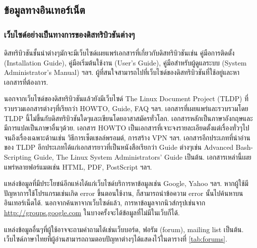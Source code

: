 \begin{thwbr}
\subsection{ข้อมูลทางอินเทอร์เน็ต}
\subsubsection{เว็บไซด์อย่างเป็นทางการของดิสทริบิวชันต่างๆ}
ดิสทริบิวชันชั้นนำต่างๆมักจะมีเว็บไซด์เผยแพร่เอกสารที่เกี่ยวกับดิสทริบิวชันเช่น คู่มือการติดตั้ง (Installation Guide), คู่มือเริ่มต้นใช้งาน (User's Guide), คู่มือสำหรับผู้ดูแลระบบ (System Administrator's Manual) ฯลฯ. ผู้ที่สนใจสามารถไปที่เว็บไซด์ของดิสทริบิวชันที่ใช้อยู่และหาเอกสารที่ต้องการ.

นอกจากเว็บไซด์ของดิสทริบิวชันแล้วยังมีเว็บไซด์ The Linux Document Project (TLDP)\cite{tldp} ที่รวบรวมเอกสารต่างๆที่เรียกว่า HOWTO, Guide, FAQ ฯลฯ. เอกสารที่เผยแพร่และรวบรวมโดย TLDP นี้ไม่ขึ้นกับดิสทริบิวชันใดๆและเขียนโดยอาสาสมัครทั่วโลก. เอกสารหลักเป็นภาษาอังกฤษและมีการแปลเป็นภาษาอื่นๆด้วย. เอกสาร HOWTO เป็นเอกสารที่เจาะจงรายละเอียดตั้งแต่เรื่องทั่วๆไปจนถึงเรื่องเฉพาะด้านเช่น วิธีการเซ็ตเชลล์พรอมต์, การสร้าง VPN ฯลฯ. เอกสารอีกประเภทที่น่าอ่านของ TLDP อีกประเภทได้แก่เอกสารยาวที่เป็นหนังสือเรียกว่า Guide ต่างๆเช่น Advanced Bash-Scripting Guide, The Linux System Administrators' Guide เป็นต้น. เอกสารเหล่านี้เผยแพร่หลายฟอร์แมตเช่น HTML, PDF, PostScript ฯลฯ. 


แหล่งข้อมูลที่มีประโยชน์อีกแห่งได้แก่เว็บไซด์บริการหาข้อมูลเช่น Google, Yahoo ฯลฯ. หากผู้ใช้มีปัญหาการใช้โปรแกรมเช่นเกิด error ขึ้นตอนใช้งาน, ก็สามารถนำข้อความ error นั้นไปค้นหาบนอินเทอร์เน็ตได้. นอกจากค้นหาจากเว็บไซด์แล้ว, การหาข้อมูลจากนิวส์กรุปเช่นจาก \url{http://groups.google.com} ในบางครั้งจะได้ข้อมูลที่ไม่มีในเว็บก็ได้. 

แหล่งข้อมูลอื่นๆที่ผู้ใช้อาจจะถามคำถามได้เช่นเว็บบอร์ด, ฟอรัม (forum), mailing list เป็นต้น. เว็บไซด์ภาษาไทยที่ผู้อ่านสามารถถามตอบปัญหาต่างๆได้แสดงไว้ในตารางที่ \ref{tab:forums}.


\end{thwbr}
